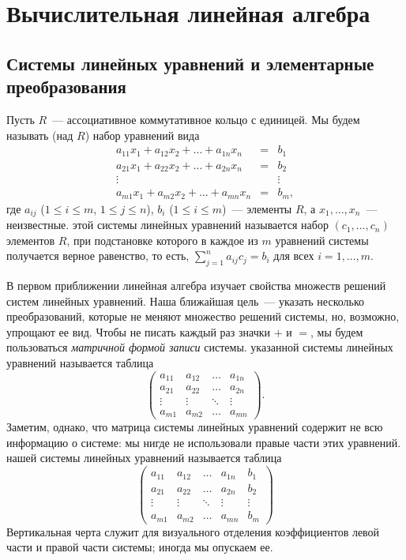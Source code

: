 
\section{Вычислительная линейная алгебра}

\subsection{Системы линейных уравнений и элементарные преобразования}\label{subsection_linear_systems}

Пусть $R$~--- ассоциативное коммутативное кольцо с единицей. Мы будем
называть  (над $R$) набор уравнений
вида
$$
\begin{array}{rcl}
a_{11}x_1+a_{12}x_2+\dots+a_{1n}x_n &=& b_1\\
a_{21}x_1+a_{22}x_2+\dots+a_{2n}x_n &=& b_2\\
\vdots & &\vdots\\
a_{m1}x_1+a_{m2}x_2+\dots+a_{mn}x_n &=& b_m,
\end{array}
$$
где $a_{ij}$ ($1\leq i\leq m$, $1\leq j\leq n$), $b_i$ ($1\leq i\leq
m$)~--- элементы $R$, а $x_1,\dots,x_n$~--- неизвестные.
 этой системы линейных уравнений называется набор
$(c_1,\dots,c_n)$ элементов $R$, при подстановке которого в каждое из
$m$ уравнений системы получается верное равенство, то есть,
$\sum_{j=1}^n a_{ij}c_j=b_i$ для всех $i=1,\dots,m$.

В первом приближении линейная алгебра изучает свойства множеств
решений систем линейных уравнений. Наша ближайшая цель~--- указать
несколько преобразований, которые не меняют множество решений системы,
но, возможно, упрощают ее вид. Чтобы не писать каждый раз значки $+$ и
$=$, мы будем пользоваться {\it матричной формой записи} системы.
 указанной
системы линейных уравнений называется таблица
$$
\begin{pmatrix}
a_{11} & a_{12} & \dots & a_{1n}\\
a_{21} & a_{22} & \dots & a_{2n} \\
\vdots & \vdots & \ddots & \vdots\\
a_{m1} & a_{m2} & \dots & a_{mn}
\end{pmatrix}.
$$
Заметим, однако, что матрица системы линейных уравнений содержит не
всю информацию о системе: мы нигде не использовали правые части этих
уравнений.  нашей
системы линейных уравнений
называется таблица
$$
\left(
\begin{array}{cccc|c}
a_{11} & a_{12} & \dots & a_{1n} & b_1\\
a_{21} & a_{22} & \dots & a_{2n} & b_2\\
\vdots & \vdots & \ddots & \vdots & \vdots\\
a_{m1} & a_{m2} & \dots & a_{mn} & b_m
\end{array}
\right)
$$
Вертикальная черта служит для визуального отделения коэффициентов
левой части и правой части системы; иногда мы опускаем ее.

